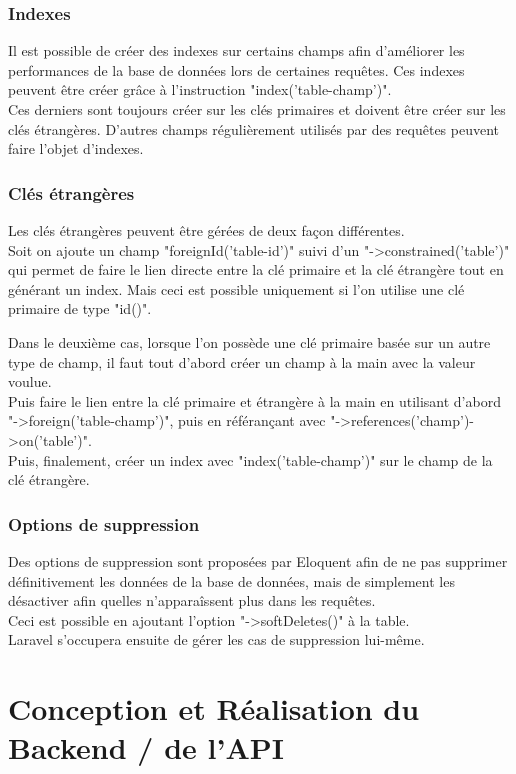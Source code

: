 \documentclass[
    iai, %
    il, %
]{heig-tb}
\begin{document}
\subsection{Indexes}
Il est possible de créer des indexes sur certains champs afin d'améliorer les performances de la base de données lors de certaines requêtes. Ces indexes peuvent être créer grâce à l'instruction "index('table-champ')".\\
Ces derniers sont toujours créer sur les clés primaires et doivent être créer sur les clés étrangères. D'autres champs régulièrement utilisés par des requêtes peuvent faire l'objet d'indexes.

\subsection{Clés étrangères}
Les clés étrangères peuvent être gérées de deux façon différentes.\\
Soit on ajoute un champ "foreignId('table-id')" suivi d'un "->constrained('table')" qui permet de faire le lien directe entre la clé primaire et la clé étrangère tout en générant un index. Mais ceci est possible uniquement si l'on utilise une clé primaire de type "id()".

Dans le deuxième cas, lorsque l'on possède une clé primaire basée sur un autre type de champ, il faut tout d'abord créer un champ à la main avec la valeur voulue.\\
Puis faire le lien entre la clé primaire et étrangère à la main en utilisant d'abord "->foreign('table-champ')", puis en référançant avec "->references('champ')->on('table')".\\
Puis, finalement, créer un index avec "index('table-champ')" sur le champ de la clé étrangère.

\subsection{Options de suppression}
Des options de suppression sont proposées par Eloquent afin de ne pas supprimer définitivement les données de la base de données, mais de simplement les désactiver afin quelles n'apparaîssent plus dans les requêtes.\\
Ceci est possible en ajoutant l'option "->softDeletes()" à la table.\\
Laravel s'occupera ensuite de gérer les cas de suppression lui-même.

\chapter{Conception et Réalisation du Backend / de l'API}
\end{document}
